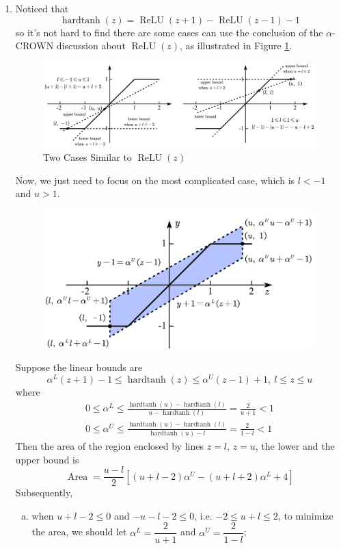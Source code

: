 \documentclass[12pt]{article}
\newcommand{\relu}[1]{\operatorname{ReLU}\left(#1\right)}
\newcommand{\hardtanh}[1]{\operatorname{hardtanh}\left(#1\right)}
\begin{document}
\begin{enumerate}[1.]
\item Noticed that
	\begin{equation}
		\hardtanh{z} = \relu{z + 1} - \relu{z - 1} - 1
	\end{equation}
	so it's not hard to find there are some cases can use the conclusion of the $\alpha$-CROWN discussion about $\relu{z}$, as illustrated in Figure \ref{fig:hardtanh_like_relu}.
	\begin{figure}[H]
		\centering
		\includegraphics[width=\linewidth]{hardtanh_like_relu}
		\caption{Two Cases Similar to $\relu{z}$}
		\label{fig:hardtanh_like_relu}
	\end{figure}
	Now, we just need to focus on the most complicated case, which is $l < -1$ and $u > 1$.
	\begin{figure}[H]
		\centering
		\includegraphics[width=0.6\linewidth]{hardtanh_comp_case}
		\caption{}
		\label{fig:hardtanh_comp_case}
	\end{figure} Suppose the linear bounds are
	\begin{equation}
		\alpha^{L} (z + 1) - 1 \leqslant \hardtanh{z} \leqslant \alpha^{U} (z - 1) + 1, \ l \leqslant z \leqslant u
	\end{equation}
	where 
	\begin{equation}
	\begin{gathered}
		0 \leqslant \alpha^{L} \leqslant \frac{\hardtanh{u} - \hardtanh{l}}{u - \hardtanh{l}} = \frac{2}{u + 1} < 1\\
		0 \leqslant \alpha^{U} \leqslant \frac{\hardtanh{u} - \hardtanh{l}}{\hardtanh{u} - l} = \frac{2}{1 - l} < 1
	\end{gathered}
	\end{equation}
	Then the area of the region enclosed by lines $z = l$, $z = u$, the lower and the upper bound is 
	\begin{equation}
		\operatorname{Area} = \frac{u - l}{2}\left[(u + l - 2) \alpha^{U} - (u + l + 2) \alpha^{L} + 4\right]
	\end{equation}
	Subsequently, 
	\begin{enumerate}[(a)]
		\item when $u + l - 2 \leqslant 0$ and $-u - l - 2 \leqslant 0$, i.e. $-2 \leqslant u + l \leqslant 2$, to minimize the area, we should let $\alpha^{L} = \dfrac{2}{u + 1}$ and $\alpha^{U} = \dfrac{2}{1 - l}$;
		

\end{enumerate}
\end{enumerate}
\end{document}
